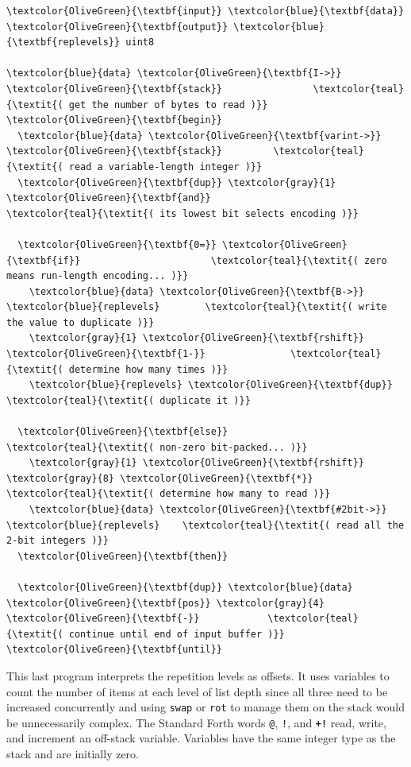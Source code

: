 \documentclass{webofc}
\begin{document}
\begin{Verbatim}[commandchars=\\\{\}]
\textcolor{OliveGreen}{\textbf{input}} \textcolor{blue}{\textbf{data}}
\textcolor{OliveGreen}{\textbf{output}} \textcolor{blue}{\textbf{replevels}} uint8

\textcolor{blue}{data} \textcolor{OliveGreen}{\textbf{I->}} \textcolor{OliveGreen}{\textbf{stack}}                \textcolor{teal}{\textit{( get the number of bytes to read )}}
\textcolor{OliveGreen}{\textbf{begin}}
  \textcolor{blue}{data} \textcolor{OliveGreen}{\textbf{varint->}} \textcolor{OliveGreen}{\textbf{stack}}         \textcolor{teal}{\textit{( read a variable-length integer )}}
  \textcolor{OliveGreen}{\textbf{dup}} \textcolor{gray}{1} \textcolor{OliveGreen}{\textbf{and}}                   \textcolor{teal}{\textit{( its lowest bit selects encoding )}}

  \textcolor{OliveGreen}{\textbf{0=}} \textcolor{OliveGreen}{\textbf{if}}                       \textcolor{teal}{\textit{( zero means run-length encoding... )}}
    \textcolor{blue}{data} \textcolor{OliveGreen}{\textbf{B->}} \textcolor{blue}{replevels}        \textcolor{teal}{\textit{( write the value to duplicate )}}
    \textcolor{gray}{1} \textcolor{OliveGreen}{\textbf{rshift}} \textcolor{OliveGreen}{\textbf{1-}}               \textcolor{teal}{\textit{( determine how many times )}}
    \textcolor{blue}{replevels} \textcolor{OliveGreen}{\textbf{dup}}             \textcolor{teal}{\textit{( duplicate it )}}

  \textcolor{OliveGreen}{\textbf{else}}                        \textcolor{teal}{\textit{( non-zero bit-packed... )}}
    \textcolor{gray}{1} \textcolor{OliveGreen}{\textbf{rshift}} \textcolor{gray}{8} \textcolor{OliveGreen}{\textbf{*}}              \textcolor{teal}{\textit{( determine how many to read )}}
    \textcolor{blue}{data} \textcolor{OliveGreen}{\textbf{#2bit->}} \textcolor{blue}{replevels}    \textcolor{teal}{\textit{( read all the 2-bit integers )}}
  \textcolor{OliveGreen}{\textbf{then}}

  \textcolor{OliveGreen}{\textbf{dup}} \textcolor{blue}{data} \textcolor{OliveGreen}{\textbf{pos}} \textcolor{gray}{4} \textcolor{OliveGreen}{\textbf{-}}            \textcolor{teal}{\textit{( continue until end of input buffer )}}
\textcolor{OliveGreen}{\textbf{until}}
\end{Verbatim}

\noindent This last program interprets the repetition levels as offsets. It uses variables to count the number of items at each level of list depth since all three need to be increased concurrently and using \texttt{swap} or \texttt{rot} to manage them on the stack would be unnecessarily complex. The Standard Forth words \texttt{@}, \texttt{!}, and \textcolor{OliveGreen}{\tt\textbf{+!}} read, write, and increment an off-stack variable. Variables have the same integer type as the stack and are initially zero.
\end{document}

